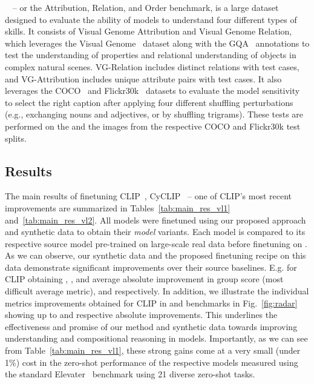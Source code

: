 \noindent\textbf{\ARO{}~\cite{aro}} -- or the Attribution, Relation, and Order benchmark, is a large dataset designed to evaluate the ability of \vl{} models to understand four different types of skills. It consists of Visual Genome Attribution and Visual Genome Relation, which leverages the Visual Genome~\cite{vg} dataset along with the GQA~\cite{gqa} annotations to test the understanding of properties and relational understanding of objects in complex natural scenes. VG-Relation includes  distinct relations with  test cases, and VG-Attribution includes  unique attribute pairs with  test cases. It also leverages the COCO~\cite{coco} and Flickr30k~\cite{flickr30k} datasets to evaluate the model sensitivity to select the right caption after applying four different shuffling perturbations (e.g., exchanging nouns and adjectives, or by shuffling trigrams). These tests are performed on the  and the  images from the respective COCO and Flickr30k test splits.

\vspace{-.05em}
\subsection{Results}
\label{sec:results}
The main results of finetuning CLIP~\cite{clip}, CyCLIP~\cite{cyclip} -- one of CLIP's most recent improvements
are summarized in Tables~\ref{tab:main_res_vl1} and~\ref{tab:main_res_vl2}. All models were finetuned using our proposed approach and \ourdataset{} synthetic data to obtain their \ours{}\textit{model} variants. Each model is compared to its respective source model pre-trained on large-scale real data before finetuning on \ourdataset{}. As we can observe, our \ourdataset{} synthetic data and the proposed finetuning recipe on this data demonstrate significant improvements over their source baselines. E.g. for CLIP obtaining , , and  average absolute improvement in \winoground{} group score (most difficult average metric), \vlchecklist{} and \ARO{} respectively. In addition, we illustrate the individual \vlc{} metrics improvements obtained for CLIP in \vlchecklist{} and \ARO{} benchmarks in Fig.~\ref{fig:radar} showing up to  and  respective absolute improvements. This underlines the effectiveness and promise of our method and \ourdataset{} synthetic data towards improving \vlc{} understanding and compositional reasoning in \vl{} models. Importantly, as we can see from Table~\ref{tab:main_res_vl1}, these strong gains come at a very small (under 1\%) cost in the zero-shot performance of the respective \vl{} models measured using the standard Elevater~\cite{elevater} benchmark using 21 diverse zero-shot tasks.


